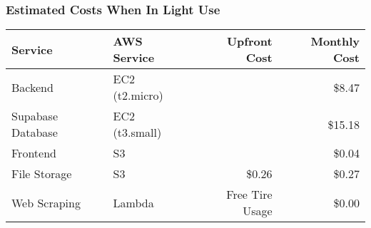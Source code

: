 \documentclass[a4paper, 11pt]{article}
\begin{document}

\vfill
\begin{table}[htbp]
    \subsubsection*{Estimated Costs When In Light Use}
    
    \setlength{\tableRowSpacing}{3pt}   %
    \centering
    \begin{tabularx}{\textwidth}{XXrr}
        \toprule
        Service             & AWS Service       & Upfront Cost & Monthly Cost \\
        \midrule
        Backend             & EC2 (t2.micro)    &               & \$8.47      \\ \addlinespace[\tableRowSpacing]
        Supabase Database   & EC2 (t3.small)    &               & \$15.18     \\ \addlinespace[\tableRowSpacing]
        Frontend            & S3                &               & \$0.04      \\ \addlinespace[\tableRowSpacing]
        File Storage        & S3                & \$0.26        & \$0.27      \\ \addlinespace[\tableRowSpacing]
        Web Scraping        & Lambda            & Free Tire Usage & \$0.00    \\ 
    \end{tabularx}
\end{table}
\end{document}
